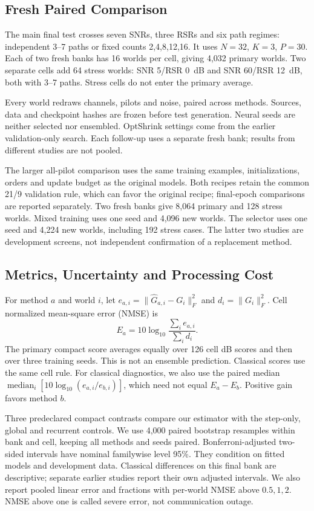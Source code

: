 \documentclass[10pt,journal,letterpaper]{IEEEtran}
\DeclareMathOperator{\median}{median}
\begin{document}
\subsection{Fresh Paired Comparison}
The main final test crosses seven SNRs, three RSRs and six path regimes: independent 3--7 paths or fixed counts 2,4,8,12,16. It uses $N=32$, $K=3$, $P=30$. Each of two fresh banks has 16 worlds per cell, giving 4,032 primary worlds. Two separate cells add 64 stress worlds: SNR 5/RSR 0~dB and SNR 60/RSR 12~dB, both with 3--7 paths. Stress cells do not enter the primary average.

Every world redraws channels, pilots and noise, paired across methods. Sources, data and checkpoint hashes are frozen before test generation. Neural seeds are neither selected nor ensembled. OptShrink settings come from the earlier validation-only search. Each follow-up uses a separate fresh bank; results from different studies are not pooled.

The larger all-pilot comparison uses the same training examples, initializations, orders and update budget as the original models. Both recipes retain the common 21/9 validation rule, which can favor the original recipe; final-epoch comparisons are reported separately. Two fresh banks give 8,064 primary and 128 stress worlds. Mixed training uses one seed and 4,096 new worlds. The selector uses one seed and 4,224 new worlds, including 192 stress cases. The latter two studies are development screens, not independent confirmation of a replacement method.

\subsection{Metrics, Uncertainty and Processing Cost}
For method $a$ and world $i$, let $e_{a,i}=\|\widehat G_{a,i}-G_i\|_F^2$ and $d_i=\|G_i\|_F^2$. Cell normalized mean-square error (NMSE) is
\begin{equation}
 E_a=10\log_{10}\frac{\sum_i e_{a,i}}{\sum_i d_i}.
 \label{eq:nmse}
\end{equation}
The primary compact score averages equally over 126 cell dB scores and then over three training seeds. This is not an ensemble prediction. Classical scores use the same cell rule. For classical diagnostics, we also use the paired median $\median_i[10\log_{10}(e_{a,i}/e_{b,i})]$, which need not equal $E_a-E_b$. Positive gain favors method $b$.

Three predeclared compact contrasts compare our estimator with the step-only, global and recurrent controls. We use 4,000 paired bootstrap resamples within bank and cell, keeping all methods and seeds paired. Bonferroni-adjusted two-sided intervals have nominal familywise level 95\%. They condition on fitted models and development data. Classical differences on this final bank are descriptive; separate earlier studies report their own adjusted intervals. We also report pooled linear error and fractions with per-world NMSE above $0.5,1,2$. NMSE above one is called severe error, not communication outage.
\end{document}
